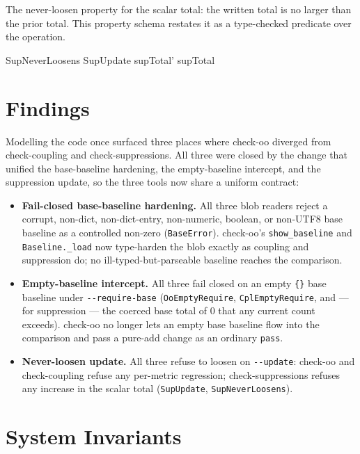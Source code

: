 \documentclass[a4paper,10pt,fleqn]{article}
\begin{document}
The never-loosen property for the scalar total: the written total is no
larger than the prior total. This property schema restates it as a
type-checked predicate over the operation.

\begin{schema}{SupNeverLoosens}
SupUpdate
\where
supTotal' \leq supTotal
\end{schema}

\section{Findings}
\label{sec:findings}

Modelling the code once surfaced three places where check-oo diverged from
check-coupling and check-suppressions. All three were closed by the change
that unified the base-baseline hardening, the empty-baseline intercept, and
the suppression update, so the three tools now share a uniform contract:

\begin{itemize}
\item \textbf{Fail-closed base-baseline hardening.} All three blob readers
  reject a corrupt, non-dict, non-dict-entry, non-numeric, boolean, or
  non-UTF8 base baseline as a controlled non-zero (\texttt{BaseError}).
  check-oo's \texttt{show\_baseline} and \texttt{Baseline.\_load} now
  type-harden the blob exactly as coupling and suppression do; no
  ill-typed-but-parseable baseline reaches the comparison.
\item \textbf{Empty-baseline intercept.} All three fail closed on an empty
  \texttt{\{\}} base baseline under \texttt{-{}-require-base}
  (\texttt{OoEmptyRequire}, \texttt{CplEmptyRequire}, and --- for
  suppression --- the coerced base total of $0$ that any current count
  exceeds). check-oo no longer lets an empty base baseline flow into the
  comparison and pass a pure-add change as an ordinary \texttt{pass}.
\item \textbf{Never-loosen update.} All three refuse to loosen on
  \texttt{-{}-update}: check-oo and check-coupling refuse any per-metric
  regression; check-suppressions refuses any increase in the scalar total
  (\texttt{SupUpdate}, \texttt{SupNeverLoosens}).
\end{itemize}

\section{System Invariants}
\end{document}

